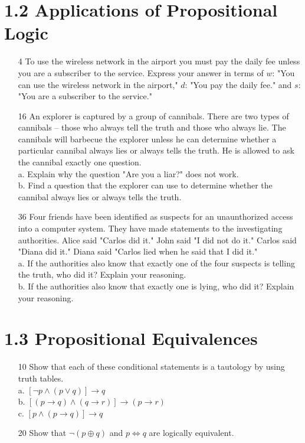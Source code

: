 \documentclass[a4paper]{article}
\begin{document}
  \section*{1.2 Applications of Propositional Logic}
  \begin{itemize}
    \item[4] To use the wireless network in the airport you must pay the daily fee unless you are a subscriber to the service. Express your answer in terms of $w$: "You can use the wireless network in the airport," $d$: "You pay the daily fee." and $s$: "You are a subscriber to the service." 
    \item[16] An explorer is captured by a group of cannibals. There are two types of cannibals -- those who always tell the truth and those who always lie. The cannibals will barbecue the explorer unless he can determine whether a particular cannibal always lies or always tells the truth. He is allowed to ask the cannibal exactly one question. \\
      a. Explain why the question "Are you a liar?" does not work. \\
      b. Find a question that the explorer can use to determine whether the cannibal always lies or always tells the truth.
    \item[36] Four friends have been identified as suspects for an unaunthorized access into a computer system. They have made statements to the investigating authorities. Alice said "Carlos did it." John said "I did not do it." Carlos said "Diana did it." Diana said "Carlos lied when he said that I did it." \\
      a. If the authorities also know that exactly one of the four suspects is telling the truth, who did it? Explain your reasoning. \\
      b. If the authorities also know that exactly one is lying, who did it? Explain your reasoning.
  \end{itemize}
 
  
  \section*{1.3 Propositional Equivalences}
  \begin{itemize}
    \item[10] Show that each of these conditional statements is a tautology by using truth tables. \\
      a. $[\neg p \land (p \lor q)] \rightarrow q$ \\
      b. $[(p \rightarrow q) \land (q \rightarrow r)] \rightarrow (p \rightarrow r)$ \\
      c. $[p \land (p \rightarrow q)] \rightarrow q$
    \item[20] Show that $\neg (p \oplus q)$ and $p \Leftrightarrow q$ are logically equivalent.
  \end{itemize}

  
  
\end{document}
